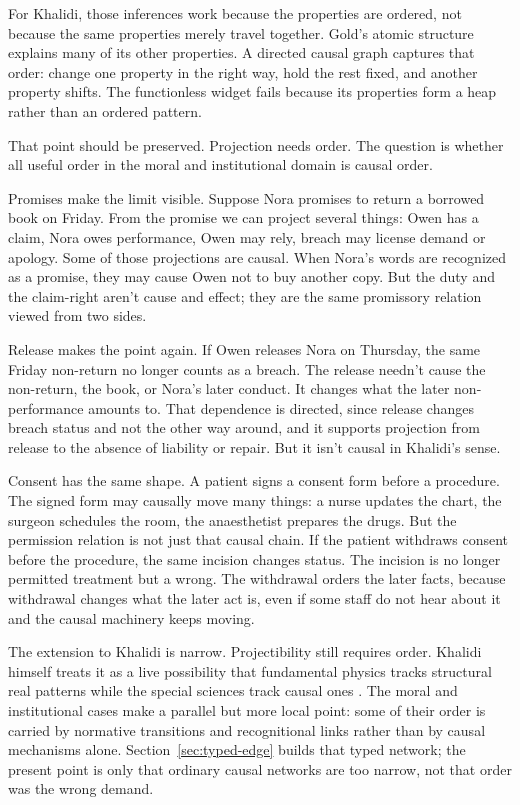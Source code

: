\documentclass[12pt]{article}
\begin{document}
For Khalidi, those inferences work because the properties are ordered, not because the same properties merely travel together. Gold's atomic structure explains many of its other properties. A directed causal graph captures that order: change one property in the right way, hold the rest fixed, and another property shifts. The functionless widget fails because its properties form a heap rather than an ordered pattern.

That point should be preserved. Projection needs order. The question is whether all useful order in the moral and institutional domain is causal order.

Promises make the limit visible. Suppose Nora promises to return a borrowed book on Friday. From the promise we can project several things: Owen has a claim, Nora owes performance, Owen may rely, breach may license demand or apology. Some of those projections are causal. When Nora's words are recognized as a promise, they may cause Owen not to buy another copy. But the duty and the claim-right aren't cause and effect; they are the same promissory relation viewed from two sides.

Release makes the point again. If Owen releases Nora on Thursday, the same Friday non-return no longer counts as a breach. The release needn't cause the non-return, the book, or Nora's later conduct. It changes what the later non-performance amounts to. That dependence is directed, since release changes breach status and not the other way around, and it supports projection from release to the absence of liability or repair. But it isn't causal in Khalidi's sense.

Consent has the same shape. A patient signs a consent form before a procedure. The signed form may causally move many things: a nurse updates the chart, the surgeon schedules the room, the anaesthetist prepares the drugs. But the permission relation is not just that causal chain. If the patient withdraws consent before the procedure, the same incision changes status. The incision is no longer permitted treatment but a wrong. The withdrawal orders the later facts, because withdrawal changes what the later act is, even if some staff do not hear about it and the causal machinery keeps moving.

The extension to Khalidi is narrow. Projectibility still requires order. Khalidi himself treats it as a live possibility that fundamental physics tracks structural real patterns while the special sciences track causal ones \citep[pp.~211--212]{khalidi2013}. The moral and institutional cases make a parallel but more local point: some of their order is carried by normative transitions and recognitional links rather than by causal mechanisms alone. Section~\ref{sec:typed-edge} builds that typed network; the present point is only that ordinary causal networks are too narrow, not that order was the wrong demand.
\end{document}
